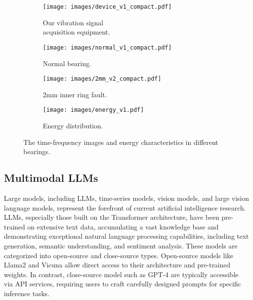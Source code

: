 \begin{figure*}[ht]
  \centering
  \begin{subfigure}[b]{0.20\linewidth}
    \texttt{[image: images/device\_v1\_compact.pdf]}
    \caption{Our vibration signal \\ acquisition equipment.}
    \label{fig:sensors}
  \end{subfigure}
  \begin{subfigure}[b]{0.25\linewidth}
    \texttt{[image: images/normal\_v1\_compact.pdf]}
    \caption{Normal bearing.}
    \label{normal bearing}
  \end{subfigure}
  \begin{subfigure}[b]{0.25\linewidth}
    \texttt{[image: images/2mm\_v2\_compact.pdf]}
    \caption{2mm inner ring fault.}
    \label{2mm inner ring fault}
  \end{subfigure}
  \begin{subfigure}[b]{0.22\linewidth}
    \texttt{[image: images/energy\_v1.pdf]}
    \caption{Energy distribution.}
    \label{fig:energy}
  \end{subfigure}
\caption{The time-frequency images and energy characteristics in different bearings.}
\label{fig:observation}
\vspace{-0.15in}
\end{figure*}

\subsection{Multimodal LLMs}
Large models, including LLMs, time-series models, vision models, and large vision language models, represent the forefront of current artificial intelligence research.
%
LLMs, especially those built on the Transformer architecture, have been pre-trained on extensive text data, accumulating a vast knowledge base and demonstrating exceptional natural language processing capabilities, including text generation, semantic understanding, and sentiment analysis.
%
These models are categorized into open-source and close-source types. Open-source models like Llama2 \cite{touvron2023llama} and Vicuna\cite{chiang2023vicuna} allow direct access to their architecture and pre-trained weights. In contrast, close-source model such as GPT-4 \cite{achiam2023gpt} are typically accessible via API services, requiring users to craft carefully designed prompts for specific inference tasks.

